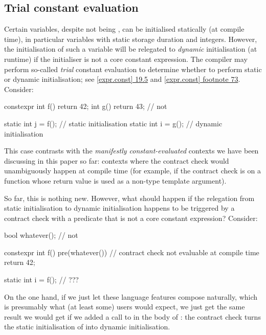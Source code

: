 
\subsection{Trial constant evaluation}

Certain variables, despite not being , can be initialised statically (at compile time), in particular variables with static storage duration and  integers. However, the initialisation of such a variable will be relegated to \emph{dynamic} initialisation (at runtime) if the initialiser is not a core constant expression. The compiler may perform so-called \emph{trial} constant evaluation to determine whether to perform static or dynamic initialisation; see \href{https://eel.is/c++draft/expr.const#19.5}{[expr.const] 19.5} and \href{https://eel.is/c++draft/expr.const#footnote-73}{[expr.const] footnote 73}. Consider:

\begin{codeblock}
constexpr int f() { return 42; }
int g() { return 43; }  // not 

static int j = f();     // static initialisation
static int i = g();     // dynamic initialisation

\end{codeblock}

This case contrasts with the \emph{manifestly constant-evaluated} contexts we have been discussing in this paper so far: contexts where the contract check would unambiguously happen at compile time (for example, if the contract check is on a function whose return value is used as a non-type template argument).

So far, this is nothing new. However, what should happen if the relegation from static initialisation to dynamic initialisation happens to be triggered by a contract check with a predicate that is not a core constant expression? Consider:

\begin{codeblock}
bool whatever();     // not 

constexpr int f()
  pre(whatever()) {  // contract check not evaluable at compile time
  return 42;
}

static int i = f();  // ???
\end{codeblock}

On the one hand, if we just let these language features compose naturally, which is presumably what (at least some) users would expect, we just get the same result we would get if we added a call to  in the body of : the contract check turns the static initialisation of  into dynamic initialisation.

